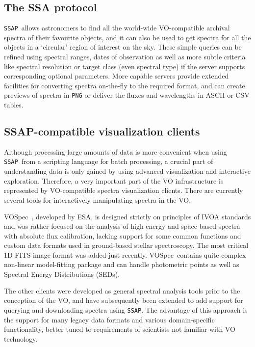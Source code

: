\documentclass[final,authoryear,5p,times,twocolumn]{elsarticle}
\newcommand{\ssap}{\texttt{SSAP}}
\newcommand{\vospec}{\textsf{\small VOSpec}}
\newcommand{\ascl}[1]{\href{http://www.ascl.net/#1}{ascl:#1}}
\begin{document}
\subsection{The SSA protocol}
%
\ssap\ allows astronomers to find all the world-wide VO-compatible archival
spectra of their favourite objects, and it can also be used to get spectra for
all the objects in a `circular' region of interest on the sky. These simple
queries can be refined using spectral ranges, dates of observation as well as
more subtle criteria like spectral resolution or target class (even spectral
type) if the server supports corresponding optional parameters. More capable
servers provide extended facilities for converting spectra on-the-fly to the
required format, and can create previews of spectra in \texttt{PNG} or deliver
the fluxes and wavelengths in ASCII or CSV tables.

\subsection{SSAP-compatible visualization clients}

Although processing large amounts of data is more convenient when using \ssap\
from a scripting language for batch processing, a crucial part of understanding
data is only gained by using advanced visualization and interactive
exploration.  Therefore, a very important part of the VO infrastructure is
represented by VO-compatible spectra visualization clients. There are currently
several tools for interactively manipulating spectra in the VO.

\vospec\ \citep[][\ascl{1205.011}]{2005ASPC..347..198O}, developed by ESA, is
designed strictly on principles of IVOA standards and was rather focused on
the analysis of high energy and space-based spectra with absolute flux
calibration, lacking support for some common functions and custom data formats
used in ground-based stellar spectroscopy. The most critical 1D FITS image
format was added just recently. \vospec\ contains quite complex non-linear
model-fitting package and can handle photometric points as well as Spectral
Energy Distributions (SEDs).

The other clients were developed as general spectral analysis tools prior to
the conception of the VO, and have subsequently been extended to add support
for querying and downloading spectra using \ssap.  The advantage of this
approach is the support for many legacy data formats and various
domain-specific functionality, better tuned to requirements of scientists not
familiar with VO technology.
\end{document}
